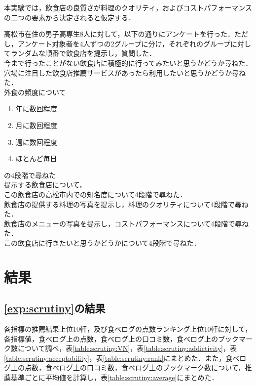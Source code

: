 		本実験では，飲食店の良質さが料理のクオリティ，およびコストパフォーマンスの二つの要素から決定されると仮定する．\par
		高松市在住の男子高専生8人に対して，以下の通りにアンケートを行った．ただし，アンケート対象者を4人ずつの2グループに分け，それぞれのグループに対してランダムな順番で飲食店を提示し，質問した．\\
		今まで行ったことがない飲食店に積極的に行ってみたいと思うかどうか尋ねた．\\
		穴場に注目した飲食店推薦サービスがあったら利用したいと思うかどうか尋ねた．\\
		外食の頻度について
		\begin{enumerate}
			\item 年に数回程度
			\item 月に数回程度
			\item 週に数回程度
			\item ほとんど毎日
		\end{enumerate}
		の4段階で尋ねた\\
		提示する飲食店について，\\
		この飲食店の高松市内での知名度について4段階で尋ねた．\\
		飲食店の提供する料理の写真を提示し，料理のクオリティについて4段階で尋ねた．\\
		飲食店のメニューの写真を提示し，コストパフォーマンスについて4段階で尋ねた．\\
		この飲食店に行きたいと思うかどうかについて4段階で尋ねた．\\
\section{結果}
	\subsection{\ref{exp:scrutiny}の結果}
	各指標の推薦結果上位10軒，及び食べログの点数ランキング上位10軒に対して，各指標値，食べログ上の点数，食べログ上の口コミ数，食べログ上のブックマーク数について調べ，表\ref{table:scrutiny:VN}，表\ref{table:scrutiny:addictivity}，表\ref{table:scrutiny:acceptability}，表\ref{table:scrutiny:rank}にまとめた．また，食べログ上の点数，食べログ上の口コミ数，食べログ上のブックマーク数について，推薦基準ごとに平均値を計算し，表\ref{table:scrutiny:average}にまとめた．
	
	
	
	
	
	\newpage


